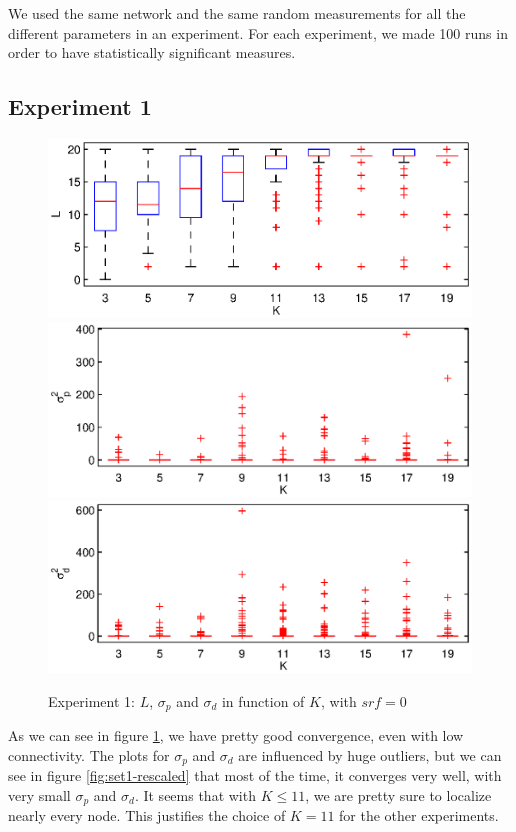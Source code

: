 \documentclass[letterpaper, 10 pt, conference]{ieeeconf}  %
\begin{document}
We used the same network and the same random measurements for all the different parameters in an experiment. For each experiment, we made 100 runs in order to have statistically significant measures.

\subsection{Experiment 1}
\begin{figure}[ht!]
\centering
\includegraphics[width=1\columnwidth]{set1-L-nosrf.eps}
\includegraphics[width=1\columnwidth]{set1-sp-nosrf.eps}
\includegraphics[width=1\columnwidth]{set1-sd-nosrf.eps}
\caption{\label{figure:set1}Experiment 1: $L$, $\sigma_p$ and $\sigma_d$ in function of $K$, with $srf=0$}
\end{figure}

As we can see in figure \ref{figure:set1}, we have pretty good convergence, even with low connectivity. The plots for $\sigma_p$ and $\sigma_d$ are influenced by huge outliers, but we can see in figure \ref{fig:set1-rescaled} that most of the time, it converges very well, with very small $\sigma_p$ and $\sigma_d$. It seems that with $K \leq 11$, we are pretty sure to localize nearly every node. This justifies the choice of $K=11$ for the other experiments.
\end{document}

